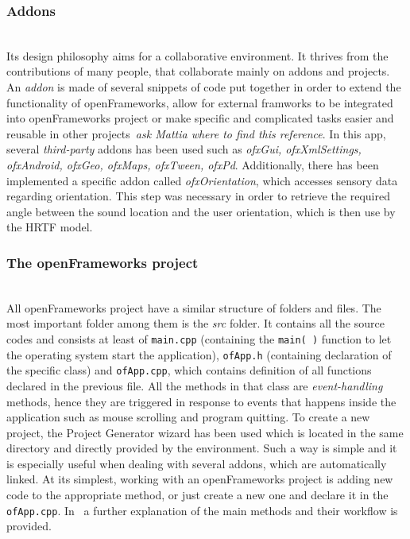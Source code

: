 \documentclass[journal]{IEEEtran}
\begin{document}
\begin{appendices}
\subsubsection{Addons}~\\
Its design philosophy aims for a collaborative environment. It thrives from the contributions of many people, that collaborate mainly on addons and projects. An \emph{addon} is made of several snippets of code put together in order to extend the functionality of openFrameworks,  allow for external framworks to be integrated into openFrameworks project or make specific and complicated tasks easier and reusable in other projects~\cite{}{\footnotesize{\textit{ask Mattia where to find this reference}}}.
In this app, several \textit{third-party} addons has been used such as \emph{ofxGui, ofxXmlSettings, ofxAndroid, ofxGeo, ofxMaps, ofxTween, ofxPd}. Additionally, there has been implemented a specific addon called \emph{ofxOrientation}, which accesses sensory data regarding orientation. This step was necessary in order to retrieve the required angle between the sound location and the user orientation, which is then use by the HRTF model.

\subsubsection{The openFrameworks project}~\\
All openFrameworks project have a similar structure of folders and files. The most important folder among them is the \emph{src} folder. It contains all the source codes and consists at least of \texttt{main.cpp} (containing the \texttt{main( )} function to let the operating system start the application), \texttt{ofApp.h} (containing declaration of the specific class) and \texttt{ofApp.cpp}, which contains definition of all functions declared in the previous file. All the methods in that class are \emph{event-handling} methods, hence they are triggered in response to events that happens inside the application such as mouse scrolling and program quitting.%
To create a new project, the Project Generator wizard has been used which is located in the same directory and directly provided by the environment. Such a way is simple and it is especially useful when dealing with several addons, which are automatically linked. 
At its simplest, working with an openFrameworks project is adding new code to the appropriate method, or just create a new one and declare it in the \texttt{ofApp.cpp}. In~\cite{OpenFrameworks} a further explanation of the main methods and their workflow is provided.



\end{appendices}
\end{document}
